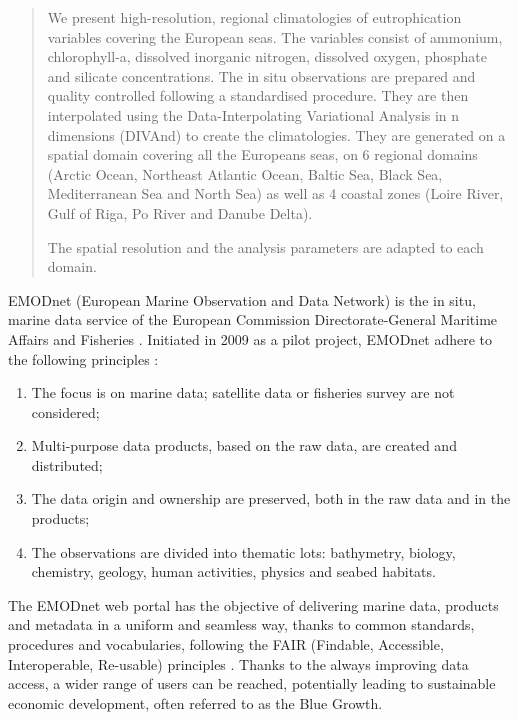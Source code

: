 \documentclass[essd, manuscript]{copernicus}
\begin{document}

\maketitle



\begin{abstract}
We present high-resolution, regional climatologies of eutrophication variables covering the European seas. The variables consist of ammonium, chlorophyll-a, dissolved inorganic nitrogen, dissolved oxygen, phosphate and silicate concentrations. The in situ observations are prepared and quality controlled following a standardised procedure. They are then interpolated using the Data-Interpolating Variational Analysis in n dimensions (DIVAnd) to create the climatologies. They are generated on a spatial domain covering all the Europeans seas, on 6 regional domains (Arctic Ocean, Northeast Atlantic Ocean, Baltic Sea, Black Sea, Mediterranean Sea and North Sea) as well as 4 coastal zones (Loire River, Gulf of Riga, Po River and Danube Delta).

The spatial resolution and the analysis parameters are adapted to each domain.
\end{abstract}


\introduction  %

EMODnet (European Marine Observation and Data Network) is the in situ, marine data service of the European Commission Directorate-General Maritime Affairs and Fisheries \citep{MartinMiguez2019}. Initiated in 2009 as a pilot project, EMODnet adhere to the following principles \citet{Shepherd2018}: 
\begin{enumerate}
\item The focus is on marine data; satellite data or fisheries survey are not considered; 
\item Multi-purpose data products, based on the raw data, are created and distributed; 
\item The data origin and ownership are preserved, both in the raw data and in the products; 
\item The observations are divided into thematic lots: bathymetry, biology, chemistry, geology, human activities, physics and seabed habitats. 
\end{enumerate} 

The EMODnet web portal has the objective of delivering marine data, products and metadata in a uniform and seamless way, thanks to common standards, procedures and vocabularies, following the FAIR (Findable, Accessible, Interoperable, Re-usable) principles \citep {Wilkinson2016,Wilkinson2019}. Thanks to the always improving data access, a wider range of users can be reached, potentially leading to sustainable economic development, often referred to as the Blue Growth. 
\end{document}
